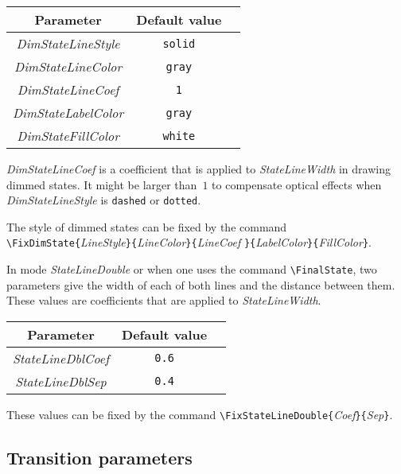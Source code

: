 \documentclass[11pt,twoside]{article}
\begin{document}
\begin{center}
\begin{tabular}{c|c|c|}
Parameter & Default value\\
\hline
\textit{DimStateLineStyle} & \texttt{solid} \\
\hline
\textit{DimStateLineColor} & \texttt{gray} \\
\hline
\textit{DimStateLineCoef} & \texttt{1} \\
\hline
\textit{DimStateLabelColor} & \texttt{gray}\\
\hline
\textit{DimStateFillColor} & \texttt{white} \\
\hline
\end{tabular}
\end{center}

\textit{DimStateLineCoef} is a coefficient that is applied to
\textit{StateLineWidth} in drawing dimmed states. It might be larger
than~$1$ to compensate optical effects when 
\textit{DimStateLineStyle} is \texttt{dashed} or \texttt{dotted}.

The style of dimmed states can be fixed by the command
\\\verb+\FixDimState{+\textit{LineStyle}\verb+}{+\textit{LineColor}\verb+}{+\textit{LineCoef}%
\verb+}{+\textit{LabelColor}\verb+}{+\textit{FillColor}\verb+}+.
\medskip

In mode \textsl{StateLineDouble} or when one uses the command \verb+\FinalState+,
two parameters give the width of each of both lines
and the distance between them. These values are coefficients that are
applied to \textsl{StateLineWidth}.

\begin{center}
\begin{tabular}{c|c|c|}
Parameter & Default value\\
\hline
\textsl{StateLineDblCoef} & \texttt{0.6} \\
\hline
\textsl{StateLineDblSep} & \texttt{0.4} \\
\hline
\end{tabular}
\end{center}

These values can be fixed by the command 
\verb+\FixStateLineDouble{+\textsl{Coef}\verb+}{+\textsl{Sep}\texttt{\}}.

\subsection{Transition parameters}\label{sec.tra-par}
\end{document}

